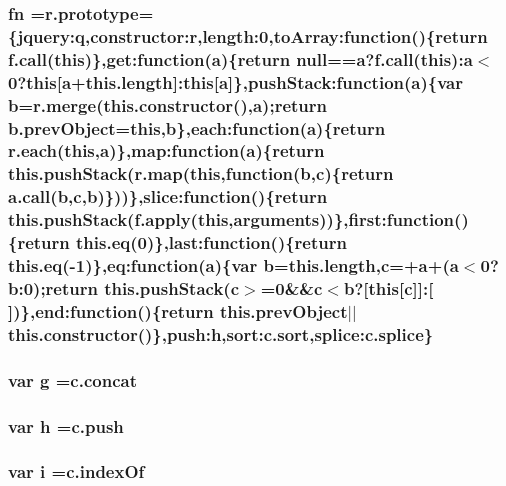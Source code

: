 \subsubsection[{\texorpdfstring{fn}{fn}}]{ fn =r.\+prototype=\{jquery\+:q,constructor\+:r,length\+:0,to\+Array\+:function()\{return f.\+call({\bf this})\},get\+:function({\bf a})\{return null=={\bf a}?f.\+call({\bf this})\+:{\bf a}$<$0?{\bf this}\mbox{[}{\bf a}+this.\+length\mbox{]}\+:{\bf this}\mbox{[}{\bf a}\mbox{]}\},push\+Stack\+:function({\bf a})\{var {\bf b}=r.\+merge(this.\+constructor(),{\bf a});return b.\+prev\+Object={\bf this},{\bf b}\},each\+:function({\bf a})\{return {\bf r.\+each}({\bf this},{\bf a})\},map\+:function({\bf a})\{return this.\+push\+Stack({\bf r.\+map}({\bf this},function({\bf b},{\bf c})\{return a.\+call({\bf b},{\bf c},{\bf b})\}))\},slice\+:function()\{return this.\+push\+Stack(f.\+apply({\bf this},arguments))\},first\+:function()\{return this.\+eq(0)\},last\+:function()\{return this.\+eq(-\/1)\},eq\+:function({\bf a})\{var {\bf b}=this.\+length,{\bf c}=+{\bf a}+({\bf a}$<$0?b\+:0);return this.\+push\+Stack({\bf c}$>$=0\&\&{\bf c}$<${\bf b}?\mbox{[}{\bf this}\mbox{[}{\bf c}\mbox{]}\mbox{]}\+:\mbox{[}$\,$\mbox{]})\},end\+:function()\{return this.\+prev\+Object$\vert$$\vert$this.\+constructor()\},push\+:h,sort\+:c.\+sort,splice\+:c.\+splice\}}\hypertarget{jquery-3_8js_abf890a0227732ad023a253e8c19e0660}{}\label{jquery-3_8js_abf890a0227732ad023a253e8c19e0660}
\subsubsection[{\texorpdfstring{g}{g}}]{\setlength{\rightskip}{0pt plus 5cm}var g =c.\+concat}\hypertarget{jquery-3_8js_a103df269476e78897c9c4c6cb8f4eb06}{}\label{jquery-3_8js_a103df269476e78897c9c4c6cb8f4eb06}
\subsubsection[{\texorpdfstring{h}{h}}]{\setlength{\rightskip}{0pt plus 5cm}var h =c.\+push}\hypertarget{jquery-3_8js_a79fe0eb780a2a4b5543b4dddf8b6188a}{}\label{jquery-3_8js_a79fe0eb780a2a4b5543b4dddf8b6188a}
\subsubsection[{\texorpdfstring{i}{i}}]{\setlength{\rightskip}{0pt plus 5cm}var i =c.\+index\+Of}\hypertarget{jquery-3_8js_a5e25b1d1bed9ab5f3174b76d6a722180}{}\label{jquery-3_8js_a5e25b1d1bed9ab5f3174b76d6a722180}
